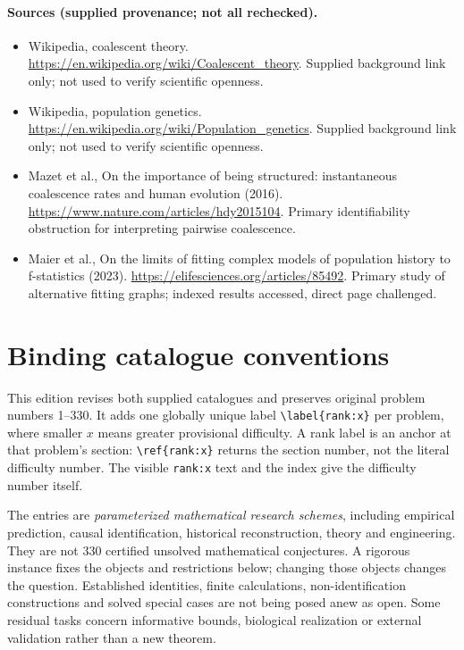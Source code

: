 \documentclass[11pt]{article}
\begin{document}
\paragraph{Sources (supplied provenance; not all rechecked).}
\begin{itemize}
\item Wikipedia, coalescent theory. \url{https://en.wikipedia.org/wiki/Coalescent_theory}. Supplied background link only; not used to verify scientific openness.
\item Wikipedia, population genetics. \url{https://en.wikipedia.org/wiki/Population_genetics}. Supplied background link only; not used to verify scientific openness.
\item Mazet et al., On the importance of being structured: instantaneous coalescence rates and human evolution (2016). \url{https://www.nature.com/articles/hdy2015104}. Primary identifiability obstruction for interpreting pairwise coalescence.
\item Maier et al., On the limits of fitting complex models of population history to f-statistics (2023). \url{https://elifesciences.org/articles/85492}. Primary study of alternative fitting graphs; indexed results accessed, direct page challenged.
\end{itemize}


\section*{Binding catalogue conventions}
This edition revises both supplied catalogues and preserves original problem numbers 1--330. It adds one globally unique label \verb|\label{rank:x}| per problem, where smaller $x$ means greater provisional difficulty. A rank label is an anchor at that problem's section: \verb|\ref{rank:x}| returns the section number, not the literal difficulty number. The visible \texttt{rank:x} text and the index give the difficulty number itself.

The entries are \emph{parameterized mathematical research schemes}, including empirical prediction, causal identification, historical reconstruction, theory and engineering. They are not 330 certified unsolved mathematical conjectures. A rigorous instance fixes the objects and restrictions below; changing those objects changes the question. Established identities, finite calculations, non-identification constructions and solved special cases are not being posed anew as open. Some residual tasks concern informative bounds, biological realization or external validation rather than a new theorem.
\end{document}
